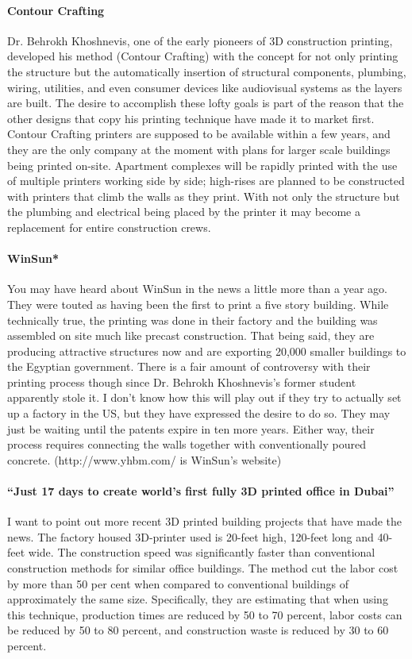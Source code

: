 \documentclass[12pt]{article}
\begin{document}
\paragraph{Contour Crafting}
Dr. Behrokh Khoshnevis, one of the early pioneers of 3D construction printing, developed his method (Contour Crafting) with the concept for not only printing the structure but the automatically insertion of structural components, plumbing, wiring, utilities, and even consumer devices like audiovisual systems as the layers are built.  The desire to accomplish these lofty goals is part of the reason that the other designs that copy his printing technique have made it to market first.  Contour Crafting printers are supposed to be available within a few years, and they are the only company at the moment with plans for larger scale buildings being printed on-site.  Apartment complexes will be rapidly printed with the use of multiple printers working side by side; high-rises are planned to be constructed with printers that climb the walls as they print. With not only the structure but the plumbing and electrical being placed by the printer it may become a replacement for entire construction crews.
\paragraph{WinSun*}
You may have heard about WinSun in the news a little more than a year ago.  They were touted as having been the first to print a five story building.  While technically true, the printing was done in their factory and the building was assembled on site much like precast construction.  That being said, they are producing attractive structures now and are exporting 20,000 smaller buildings to the Egyptian government.  There is a fair amount of controversy with their printing process though since Dr. Behrokh Khoshnevis's former student apparently stole it.  I don't know how this will play out if they try to actually set up a factory in the US, but they have expressed the desire to do so.  They may just be waiting until the patents expire in ten more years.  Either way, their process requires connecting the walls together with conventionally poured concrete.  (http://www.yhbm.com/ is WinSun's website)
\paragraph{``Just 17 days to create world’s first fully 3D printed office in Dubai''}
I want to point out more recent 3D printed building projects that have made the news.  The factory housed 3D-printer used is 20-feet high, 120-feet long and 40-feet wide.  The construction speed was significantly faster than conventional construction methods for similar office buildings. The method cut the labor cost by more than 50 per cent when compared to conventional buildings of approximately the same size.  Specifically, they are estimating that when using this technique, production times are reduced by 50 to 70 percent, labor costs can be reduced by 50 to 80 percent, and construction waste is reduced by 30 to 60 percent.
\end{document}
